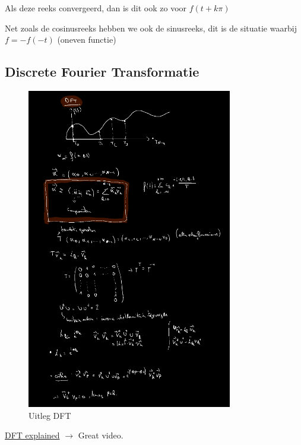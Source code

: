\documentclass[a4paper]{report}
\begin{document}
Als deze reeks convergeerd, dan is dit ook zo voor $f(t + k\pi)$

Net zoals de cosinusreeks hebben we ook de sinusreeks, dit is de situatie waarbij $f = -f(-t)$ (oneven functie)

\subsection{Discrete Fourier Transformatie}

\begin{figure}[H]
	\centering
	\includegraphics[width=0.8\textwidth]{assets/uitleg_dft.png}
	\caption{Uitleg DFT}
	\label{fig:uitleg_dft}
\end{figure}

\href{https://www.youtube.com/watch?v=mkGsMWi_j4Q}{DFT explained} $\rightarrow$ Great video.
\end{document}

